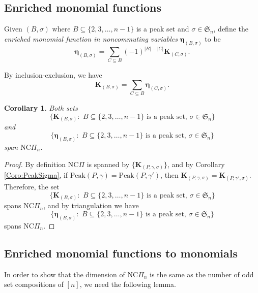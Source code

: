 \documentclass[11pt]{amsart}
\newtheorem{Corollary}[Theorem]{Corollary}
\newtheorem{Remark}[Theorem]{Remark}
\newtheorem{Definition}[Theorem]{Definition}
\numberwithin{equation}{section}
\newcommand{\Peak}{\mathrm{Peak}}
\newcommand{\NCPeak}{\mathrm{NC}\Pi}
\newcommand{\frakS}{{\mathfrak{S}}}
\newcommand{\bfK}{{\mathbf{K}}}
\newcommand{\boldeta}{{\boldsymbol{\eta}}}
\begin{document}
\subsection{Enriched monomial functions}\label{subsec:monpeak-n}


Given $(B,\sigma)$ where $B\subseteq\{2,3,\dots,n-1\}$ is a peak set and $\sigma\in\mathfrak{S}_n$, define the \emph{enriched monomial function in noncommuting variables} $\boldeta_{(B,\sigma)}$ to be
$$\boldeta_{(B,\sigma)}=\sum_{C\subseteq B}(-1)^{|B|-|C|}\mathbf{K}_{(C,\sigma)}.$$

By inclusion-exclusion, we have
$$\mathbf{K}_{(B,\sigma)}=\sum_{C\subseteq B}\boldeta_{(C,\sigma)}.$$





\begin{Corollary}\label{cor:ncpeak}
 Both sets $$\{\bfK_{(B,\sigma)}: \text{~$B\subseteq \{2,3,\dots,n-1\}$ is a peak set, $\sigma\in \frakS_n$}\}$$ and 
	$$\{\boldeta_{(B,\sigma)}: \text{~$B\subseteq \{2,3,\dots,n-1\}$ is a peak set, $\sigma\in \frakS_n$}\}$$ 
	span $\NCPeak_n$.

\end{Corollary}

\begin{proof} By definition 
$\NCPeak$ is spanned by $\{\bfK_{(P,\gamma,\sigma)}\}$, and
 by Corollary \ref{Coro:PeakSigma}, if $\Peak(P,\gamma)=\Peak(P,\gamma')$, then $\bfK_{(P,\gamma,\sigma)}=\bfK_{(P,\gamma',\sigma)}$. Therefore, the set 
 $$\{\bfK_{(B,\sigma)}: \text{~$B\subseteq \{2,3,\dots,n-1\}$ is a peak set, $\sigma\in \frakS_n$}\}$$ spans $\NCPeak_n$, and by triangulation we have $$\{\boldeta_{(B,\sigma)}: \text{~$B\subseteq \{2,3,\dots,n-1\}$ is a peak set, $\sigma\in \frakS_n$}\}$$
	spans $\NCPeak_n$.
 
\end{proof}




\subsection{Enriched monomial functions to monomials}\label{subsec:mpeak-to-M} 
In order to show that the dimension of $\NCPeak_n$ is the same as the number of odd set compositions of $[n]$, we need the following lemma.
\end{document}
